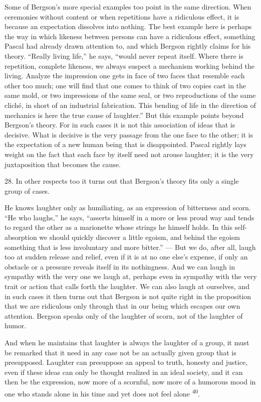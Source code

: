 \documentclass[12pt,a4paper,openany]{book}
\newcommand{\opage}[1]{\marginnote{\footnotesize\textit{[#1]}}}
\newcommand{\nm}[1]{\unskip\textsuperscript{#1}}
\begin{document}
Some of Bergson's more special examples too point in the same direction. When ceremonies without content or when repetitions have a ridiculous effect, it is because an expectation dissolves into nothing. The best example here is perhaps the way in which likeness between persons can have a ridiculous effect, something Pascal had already drawn attention to, and which Bergson rightly claims for his theory. ``Really living life,'' he says, ``would never repeat itself. Where there is repetition, complete likeness, we always suspect a mechanism working behind the living. Analyze the impression one gets in face of two faces that resemble each other too much; one will find that one comes to think of two copies cast in the same mold, or two impressions of the same seal, or two reproductions of the same cliché, in short of an industrial fabrication. This bending of life in the direction of mechanics is here the true cause of laughter.'' But this example points beyond Bergson's theory. For in such cases it is not this association of ideas that is decisive. What is decisive is the very passage from the one face to the other; it is the expectation of a new human being that is disappointed. Pascal rightly lays weight on the fact that each face by itself need not arouse laughter; it is the very juxtaposition that becomes the cause.

28. In other respects too it turns out that Bergson's theory fits only a single group of cases.

He knows laughter only as humiliating, as an expression of
\opage{50}bitterness and scorn. ``He who laughs,'' he says, ``asserts himself in a more or less proud way and tends to regard the other as a marionette whose strings he himself holds. In this self-absorption we should quickly discover a little egoism, and behind the egoism something that is less involuntary and more bitter.'' --- But we do, after all, laugh too at sudden release and relief, even if it is at no one else's expense, if only an obstacle or a pressure reveals itself in its nothingness. And we can laugh in sympathy with the very one we laugh at, perhaps even in sympathy with the very trait or action that calls forth the laughter. We can also laugh at ourselves, and in such cases it then turns out that Bergson is not quite right in the proposition that we are ridiculous only through that in our being which escapes our own attention. Bergson speaks only of the laughter of scorn, not of the laughter of humor.

And when he maintains that laughter is always the laughter of a group, it must be remarked that it need in any case not be an actually given group that is presupposed. Laughter can presuppose an appeal to truth, honesty and justice, even if these ideas can only be thought realized in an ideal society, and it can then be the expression, now more of a scornful, now more of a humorous mood in one who stands alone in his time and yet does not feel alone \nm{40}.
\end{document}
